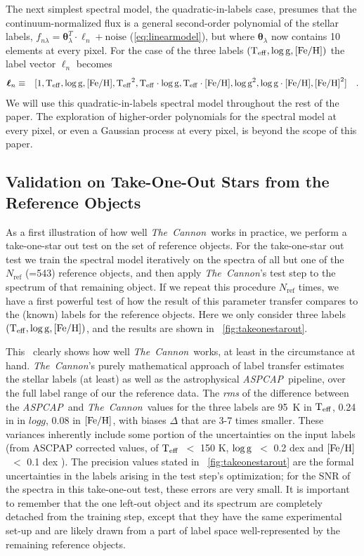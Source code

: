 \documentclass[12pt, preprint]{aastex}
\newcommand{\tc}{\textsl{The~Cannon}}
\newcommand{\aspcap}{\textsl{ASPCAP}}
\newcommand{\set}[1]{\bm{#1}}
\newcommand{\starlabel}{\ell}
\newcommand{\starlabelvec}{\set{\starlabel}}
\newcommand{\teff}{\mbox{$\rm T_{eff}$}}
\newcommand{\feh}{\mbox{$\rm [Fe/H]$}}
\newcommand{\logg}{\mbox{$\rm \log g$}}
\newcommand{\rfn}{\mathrm{ref}}
\begin{document}
The next simplest spectral model, the quadratic-in-labels case,
 presumes that the continuum-normalized flux is a general second-order polynomial of the stellar labels, $f_{n\lambda} =
\set{\theta}_\lambda^T \cdot \starlabelvec_n + \mbox{noise}$ 
(\ref{eq:linearmodel}), 
but where $\set{\theta}_\lambda$ now contains 10 elements at every pixel.
For the case of the three labels $(\teff , \logg , \feh)$ the label vector $\starlabelvec_n$
becomes  
\begin{eqnarray}
\starlabelvec_n &\equiv&
[1, \teff, \logg, \feh, \teff^2, \teff\cdot\logg, \teff\cdot\feh, \logg^2, \logg\cdot\feh, \feh^2]
 \label{eq:quadinthreelabels}\quad.
\end{eqnarray}
We will use this quadratic-in-labels spectral model throughout the rest of the paper. 
The exploration of higher-order polynomials for the spectral model at every pixel, or even a Gaussian process at every pixel, is beyond the scope of this paper. 
 
\subsection{Validation on Take-One-Out Stars from the Reference Objects}
\label{sec:take-one-out}

As a first illustration of how well \tc\ works in practice, we perform a take-one-star out test on the set of reference objects.
For the take-one-star out test we train the spectral model iteratively on the spectra of all but one of the $N_\rfn$ (=543) 
reference objects, and then apply \tc 's test step to the spectrum of that remaining object. If we repeat this procedure $N_\rfn$ times, 
we have a first powerful test of how the result of this parameter transfer compares to the (known) labels for the reference objects.
 Here we only consider three labels $(\teff , \logg , \feh)$, and the results are shown in \figurename~\ref{fig:takeonestarout}.

This \figurename\ clearly shows how well \tc\ works, at least in the circumstance at hand.
\tc 's purely mathematical approach of label transfer estimates the stellar labels (at least) as well as the astrophysical \aspcap\ pipeline,
over the full label range of our the reference data. The \textit{rms} of the difference between the \aspcap\ and \tc\ values for the three labels are
95~K in $\teff$, 0.24 in in $logg$, 0.08 in $\feh$, with biases $\Delta$ that are 3-7 times smaller.  
These variances inherently include some portion of the uncertainties on the input labels (from ASCPAP corrected values, 
of \teff\ $<$ 150 K, \logg\ $<$ 0.2 dex and \feh\ $<$ 0.1 dex \citep{Meszaros2013}).
The precision values stated in \figurename~\ref{fig:takeonestarout} are the formal uncertainties in the labels arising 
in the test step's optimization; for the SNR of the spectra in this take-one-out test, these errors are very small.
It is important to remember that the one left-out object and its spectrum are completely detached from the training step, 
except that they have the same experimental set-up and are likely drawn from a part of label space well-represented by the remaining reference objects.
\end{document}
